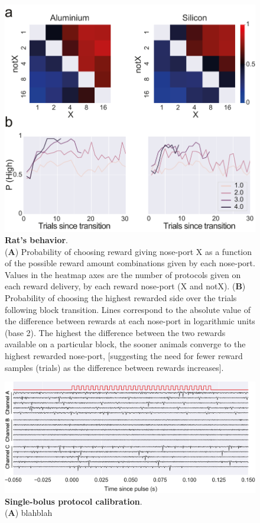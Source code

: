 \begin{figure}[ht] 
	\centering
	\includegraphics[width=1.0\linewidth]{Figures/Artboard 9.pdf}
	\caption{\textbf{Rat's behavior}.\\
		(\textbf{A}) Probability of choosing reward giving nose-port X as a function of the possible reward amount combinations given by each nose-port. Values in the heatmap axes are the number of protocols given on each reward delivery, by each reward nose-port (X and notX). (\textbf{B}) Probability of choosing the highest rewarded side over the trials following block transition. Lines correspond to the absolute value of the difference between rewards at each nose-port in logarithmic units (base 2). The highest the difference between the two rewards available on a particular block, the sooner animals converge to the highest rewarded nose-port, [suggesting the need for fewer reward samples (trials) as the difference between rewards increases]. }
	
	\label{fig:Behavior} 
\end{figure}

\begin{figure}[ht] 
	\centering
	\includegraphics[width=1.0\linewidth]{Figures/Artboard 7.pdf}
	\caption{\textbf{Single-bolus protocol calibration}.\\
	(\textbf{A}) blahblah }	
	\label{fig:Ephys}
\end{figure}





